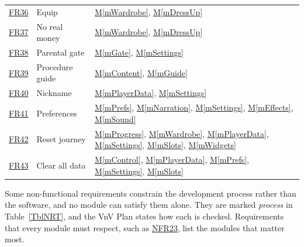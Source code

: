 \documentclass[12pt, titlepage]{article}
\newcommand{\mref}[1]{\hyperref[#1]{M\ref*{#1}}}
\newcommand{\srsurl}{https://team-hindsight.github.io/ophthamology-game/SRS/SRS.pdf}
\newcommand{\srsfrref}[2]{\href{\srsurl\#nameddest=#1}{FR#2}}
\newcommand{\srsnfrref}[2]{\href{\srsurl\#nameddest=#1}{NFR#2}}
\begin{document}
\begin{longtable}{p{} p{} p{}}
\srsfrref{FR_Equip}{36} & Equip & \mref{mWardrobe}, \mref{mDressUp}\\
\srsfrref{FR_NoRealMoney}{37} & No real money & \mref{mWardrobe}, \mref{mDressUp}\\
\srsfrref{FR_ParentGate}{38} & Parental gate & \mref{mGate}, \mref{mSettings}\\
\srsfrref{FR_ProcedureGuide}{39} & Procedure guide & \mref{mContent}, \mref{mGuide}\\
\srsfrref{FR_Nickname}{40} & Nickname & \mref{mPlayerData}, \mref{mSettings}\\
\srsfrref{FR_Preferences}{41} & Preferences & \mref{mPrefs}, \mref{mNarration}, \mref{mSettings}, \mref{mEffects}, \mref{mSound}\\
\srsfrref{FR_ResetJourney}{42} & Reset journey & \mref{mProgress}, \mref{mWardrobe}, \mref{mPlayerData}, \mref{mSettings}, \mref{mSlots}, \mref{mWidgets}\\
\srsfrref{FR_ClearAllData}{43} & Clear all data & \mref{mControl}, \mref{mPlayerData}, \mref{mPrefs}, \mref{mSettings}, \mref{mSlots}\\
\bottomrule
\end{longtable}

Some non-functional requirements constrain the development process rather than
the software, and no module can satisfy them alone. They are marked
\emph{process} in Table~\ref{TblNRT}, and the VnV Plan states how each is
checked. Requirements that every module must respect, such as
\srsnfrref{NFR_Maintainability}{23}, list the modules that matter most.
\end{document}
